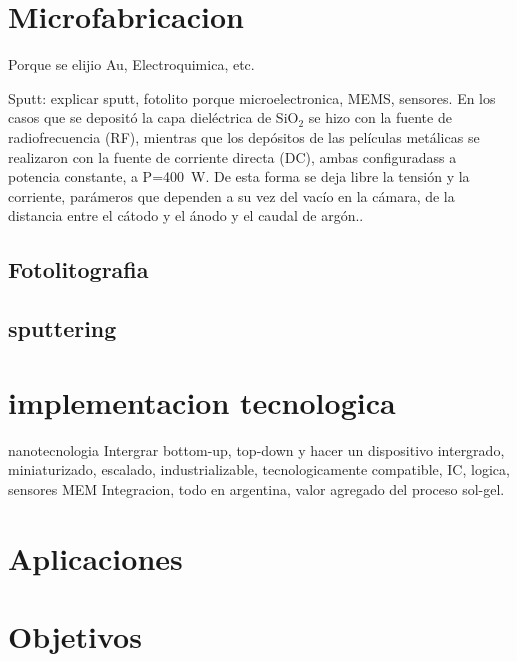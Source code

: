 \section{Microfabricacion}\label{sec:microfabricacion}

Porque se elijio Au, Electroquimica, etc.

Sputt: explicar sputt, fotolito porque microelectronica, MEMS, sensores.
En los casos que se depositó la capa dieléctrica de SiO$_2$ se hizo con la fuente de radiofrecuencia (RF), mientras que los depósitos de las películas metálicas se realizaron con la fuente de corriente directa (DC), ambas configuradass a potencia constante, a P=\SI{400}{\watt}.  De esta forma se deja libre la tensión y la corriente, parámeros que dependen a su vez del vacío en la cámara, de la distancia entre el cátodo y el ánodo y el caudal de argón.\cite{sigmund1968}. 

\subsection{Fotolitografia}\label{sec:intro_fotolito}

\subsection{sputtering}

\section{implementacion tecnologica}
nanotecnologia\cite{Gimenez2017}
Intergrar bottom-up, top-down y hacer un dispositivo intergrado, miniaturizado, escalado, industrializable, tecnologicamente compatible, IC, logica, sensores MEM
Integracion, todo en argentina, valor agregado del proceso sol-gel.\cite{Volksen2010}

\section{Aplicaciones}

\section{Objetivos}